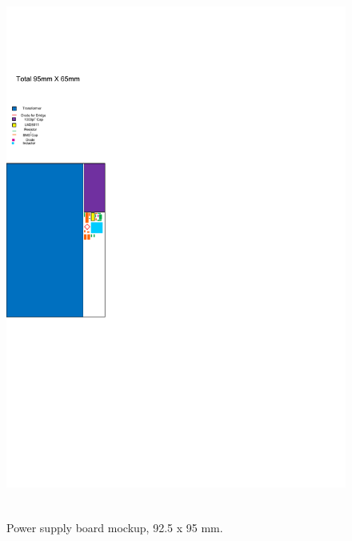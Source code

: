 \begin{figure}[htbp]
  \centering
  \includegraphics[height=7in]{business/b_includes/Power_Supply_board_and_key}
  \caption{Power supply board mockup, 92.5 x 95 mm.}
  \label{fig:power_supply_board_mockup}
\end{figure}
